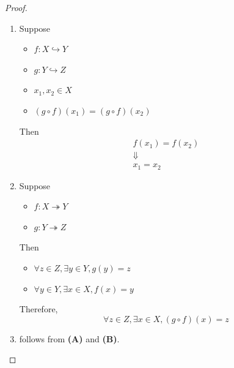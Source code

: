 \begin{proof}
  \leavevmode\par
  \begin{enumerate}[label=\textbf{(\Alph*)}]
    \item Suppose
          \begin{itemize}
            \item $f: X \hookrightarrow Y$
            \item $g: Y \hookrightarrow Z$
            \item $x_{1}, x_{2} \in X$
            \item $(g \circ f)(x_{1}) = (g \circ f)(x_{2})$
          \end{itemize}
          Then
          \[
            \begin{array}{c}
              f(x_{1}) = f(x_{2}) \\
              \Downarrow          \\
              x_{1} = x_{2}
            \end{array}
          \]
    \item Suppose
          \begin{itemize}
            \item $f: X \twoheadrightarrow Y$
            \item $g: Y \twoheadrightarrow Z$
          \end{itemize}
          Then
          \begin{itemize}
            \item $\forall z \in Z, \exists y \in Y, g(y) = z$
            \item $\forall y \in Y, \exists x \in X, f(x) = y$
          \end{itemize}
          Therefore,
          \[
            \forall z \in Z, \exists x \in X, (g \circ f)(x) = z
          \]
    \item follows from \textbf{(A)} and \textbf{(B)}.
  \end{enumerate}
\end{proof}
